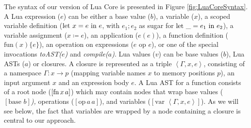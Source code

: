 \documentclass[english]{llncs}
\begin{document}
The syntax of our version of Lua Core is presented in Figure \ref{fig:LuaCoreSyntax}.
A Lua expression ($e$) can be either a base value ($b$), a variable
($x$), a scoped variable definition ($\mbox{let \ensuremath{x=e}\ in\ \ensuremath{e}}$,
with $e_{1};e_{2}$ as sugar for $\mbox{let \ensuremath{\_=e_{1}} in \ensuremath{e_{2}}}$),
a variable assignment ($x\coloneqq e$), an application ($e(e)$),
a function definition ($\mbox{fun}(x)\{e\}$), an operation on expressions
($e\mbox{ op }e$), or one of the special invocations \emph{toAST($e$)}
and \emph{compile($a$)}. Lua values ($v$) can be base values ($b$),
Lua ASTs ($a$) or closures. A closure is represented as a triple
$\left\langle \Gamma,x,e\right\rangle $, consisting of a namespace
$\Gamma:x\rightarrow p$ (mapping variable names $x$ to memory positions
$p$), an input argument $x$ and an expression body $e$. A Lua AST
for a function consists of a root node ($[\mbox{fn\,\ensuremath{x}\,\ensuremath{a}}]$)
which may contain nodes that wrap base values\emph{ }($[\mbox{base }b]$\emph{),
}operations ($[\mbox{op}\, a\, a]$), and variables ($[\mbox{var }\left\langle \Gamma,x,e\right\rangle ]$).
As we will see below, the fact that variables are wrapped by a node
containing a closure is central to our approach.
\end{document}
